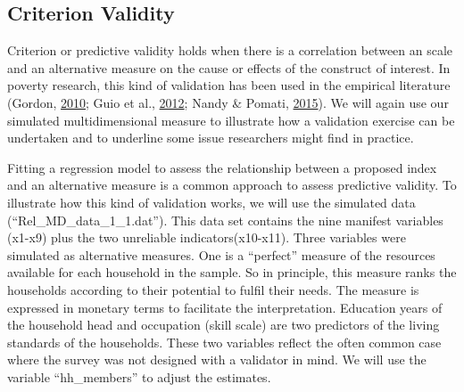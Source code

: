 \documentclass[]{book}
\begin{document}
\hypertarget{criterion-validity-1}{%
\subsection{Criterion Validity}\label{criterion-validity-1}}

Criterion or predictive validity holds when there is a correlation between an scale and an alternative measure on the cause or effects of the construct of interest. In poverty research, this kind of validation has been used in the empirical literature (Gordon, \protect\hyperlink{ref-Gordon2010}{2010}; Guio et al., \protect\hyperlink{ref-Guio2012}{2012}; Nandy \& Pomati, \protect\hyperlink{ref-Nandy2015}{2015}). We will again use our simulated multidimensional measure to illustrate how a validation exercise can be undertaken and to underline some issue researchers might find in practice.

Fitting a regression model to assess the relationship between a proposed index and an alternative measure is a common approach to assess predictive validity. To illustrate how this kind of validation works, we will use the simulated data (``Rel\_MD\_data\_1\_1.dat''). This data set contains the nine manifest variables (x1-x9) plus the two unreliable indicators(x10-x11). Three variables were simulated as alternative measures. One is a ``perfect'' measure of the resources available for each household in the sample. So in principle, this measure ranks the households according to their potential to fulfil their needs. The measure is expressed in monetary terms to facilitate the interpretation. Education years of the household head and occupation (skill scale) are two predictors of the living standards of the households. These two variables reflect the often common case where the survey was not designed with a validator in mind. We will use the variable ``hh\_members'' to adjust the estimates.
\end{document}
